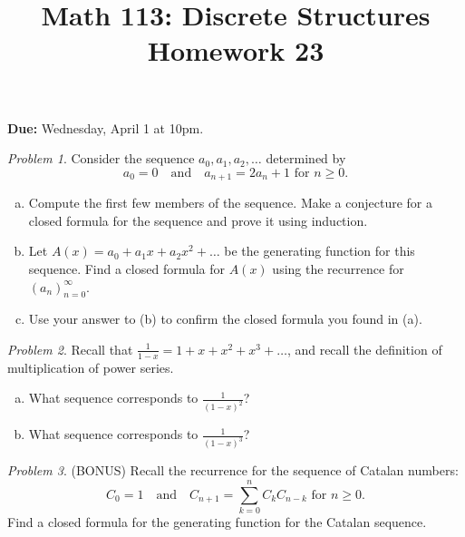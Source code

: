 \documentclass[11pt,twoside]{amsart}
\title{Math 113: Discrete Structures\\ Homework 23}
\theoremstyle{plain}
\theoremstyle{remark}
\newtheorem{prob}{Problem}
\theoremstyle{definition}
\theoremstyle{definition}
\begin{document}
\maketitle

\noindent
\textbf{Due:} Wednesday, April 1 at 10pm.
\bigskip

\begin{prob}
Consider the sequence $a_0,a_1,a_2,\dots$ determined by
\[a_0=0 \quad \text{and} \quad a_{n+1}=2a_n+1 \text{ for }n\geq0.\]

  \begin{enumerate}[(a)]
    \item Compute the first few members of the sequence. Make a conjecture for a closed formula for the sequence and prove it using induction.
    \item Let $A(x)=a_0+a_1x+a_2x^2+\dots$ be the generating function for this sequence. Find a closed formula for $A(x)$ using the recurrence for $(a_n)_{n=0}^\infty$.
    \item Use your answer to (b) to confirm the closed formula you found in (a).
  \end{enumerate}
\end{prob}

\begin{prob}  Recall that $\frac{1}{1-x}=1+x+x^2+x^3+\dots$, and recall the definition of multiplication of power series.
\begin{enumerate}[(a)]
 \item  What sequence corresponds to $\frac{1}{(1-x)^2}$?
 \item What sequence corresponds to $\frac{1}{(1-x)^3}$?
\end{enumerate}
\end{prob}

\begin{prob} (BONUS) Recall the recurrence for the sequence of Catalan numbers:
\[C_0=1 \quad \text{and} \quad C_{n+1}=\sum_{k=0}^n C_kC_{n-k} \text{ for } n\geq 0.\]
Find a closed formula for the generating function for the Catalan sequence.
\end{prob}
\end{document}
